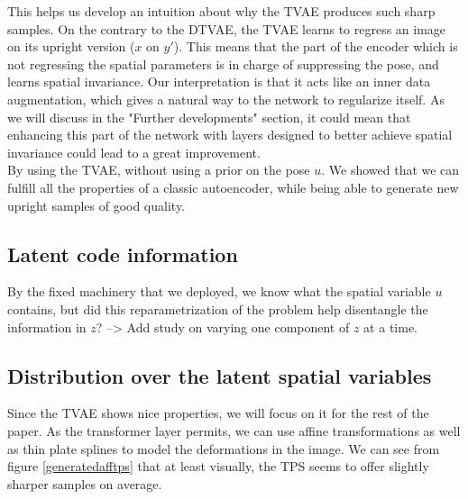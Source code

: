\documentclass[letterpaper, twoside]{article}
\begin{document}
This helps us develop an intuition about why the TVAE produces such sharp samples. On the contrary to the DTVAE, the TVAE learns to regress an image on its upright version ($x$ on $y'$). This means that the part of the encoder which is not regressing the spatial parameters is in charge of suppressing the pose, and learns spatial invariance. Our interpretation is that it acts like an inner data augmentation, which gives a natural way to the network to regularize itself. As we will discuss in the "Further developments" section, it could mean that enhancing this part of the network with layers designed to better achieve spatial invariance could lead to a great improvement.\\
By using the TVAE, without using a prior on the pose $u$. We showed that we can fulfill all the properties of a classic autoencoder, while being able to generate new upright samples of good quality.

\subsection{Latent code information}
By the fixed machinery that we deployed, we know what the spatial variable $u$ contains, but did this reparametrization of the problem help disentangle the information in $z$? --> Add study on varying one component of $z$ at a time.


\subsection{Distribution over the latent spatial variables}

Since the TVAE shows nice properties, we will focus on it for the rest of the paper. As the transformer layer \cite{Jaderberg.stn} permits, we can use affine transformations as well as thin plate splines to model the deformations in the image. We can see from figure \ref{generatedafftps} that at least visually, the TPS seems to offer slightly sharper samples on average.\\
\end{document}
